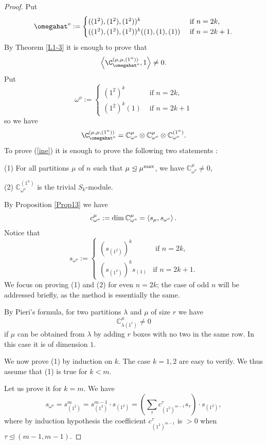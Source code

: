\begin{proof} Put 
	$$
	\omegahat^o:=\begin{cases}((1^2),(1^2),(1^2))^k&\text{ if } n=2k,\\
		((1^2),(1^2),(1^2))^k((1),(1),(1))&\text{ if }n=2k+1.\end{cases}
	$$
	By Theorem \ref{L1-3} it is enough to prove that
	\begin{equation}
		\left\langle \C_{\omegahat^o}^{(\mu,\mu,(1^n))},1\right\rangle\neq 0.
		\label{ine}\end{equation}
	Put
	$$
	\omega^o:=\begin{cases}(1^2)^k&\text{ if } n=2k,\\
		(1^2)^k(1)&\text{ if }n=2k+1\end{cases}
	$$
	so we have
	$$
	\C_{\omegahat^o}^{(\mu,\mu,(1^n))}=\mathbb{C}_{\omega^o}^\mu\otimes\mathbb{C}_{\omega^o}^\mu\otimes\mathbb{C}_{\omega^o}^{(1^n)}.
	$$
	To prove (\ref{ine}) it is enough to prove the following two statements :
	
	(1) For all partitions $\mu$ of $n$ such that $\mu\trianglelefteq \mu^{\rm max}$, we have $\mathbb{C}_{\omega^o}^\mu\neq 0$,
	
	(2) $\mathbb{C}_{\omega^o}^{(1^n)}$ is the trivial $S_k$-module.
	
	
	
	By Proposition \ref{Prop13} we have
	$$
	c_{\omega^o}^\mu:={\rm dim}\, \mathbb{C}_{\omega^o}^\mu=\left\langle s_\mu,s_{\omega^o}\right\rangle.
	$$
	Notice that
	$$
	s_{\omega^o}:=\begin{cases}(s_{(1^2)})^k&\text{ if }n=2k,\\
		(s_{(1^2)})^k s_{(1)}&\text{if }n=2k+1.\end{cases}
	$$
	We focus on proving (1) and (2) for even \(n = 2k\); the case of odd \(n\) will be addressed briefly, as the method is essentially the same.
	
	
	By Pieri's formula, for two partitions $\lambda$ and $\mu$ of size $r$ we have
	$$
	\mathbb{C}^\mu_{\lambda (1^r)}\neq 0
	$$
	if $\mu$ can be obtained from $\lambda$ by adding $r$ boxes with no two in the same row. In this case it is of dimension $1$. 
	
	
	
	We now prove (1) by induction on $k$. The case $k=1, 2$ are easy to verify. We thus assume that (1) is true for $k<m$.
	
	Let us prove it for $k=m$. We have
	$$
	s_{\omega^o}=s_{(1^2)}^m=s_{(1^2)}^{m-1}\cdot s_{(1^2)}=\left(\sum_{\tau}c_{(1^2)^{m-1}}^\tau s_\tau\right)\cdot s_{(1^2)},
	$$
	where by induction hypothesis the coefficient $c_{(1^2)^{m-1}}^\tau$ is $> 0$ when $\tau\trianglelefteq (m-1,m-1)$.
	

\end{proof}
